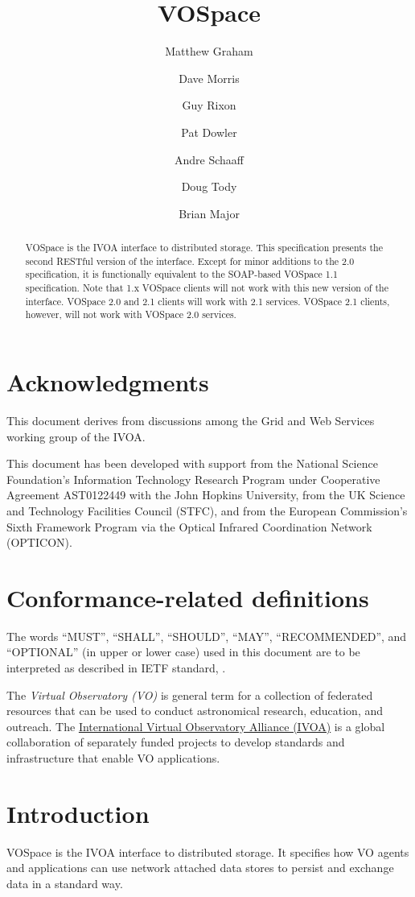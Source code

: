 \documentclass[11pt,a4paper]{ivoa}
\title{VOSpace}
\author{Matthew Graham}
\author{Dave Morris}
\author{Guy Rixon}
\author{Pat Dowler}
\author{Andre Schaaff}
\author{Doug Tody}
\author{Brian Major}
\begin{document}
\begin{abstract}
VOSpace is the IVOA interface to distributed storage. This specification presents the second RESTful version of the interface.  Except for minor additions to the 2.0 specification, it is functionally equivalent to the SOAP-based VOSpace 1.1 specification. Note that 1.x VOSpace clients will not work with this new version of the interface.  VOSpace 2.0 and 2.1 clients will work with 2.1 services.  VOSpace 2.1 clients, however, will not work with VOSpace 2.0 services.
\end{abstract}

\section*{Acknowledgments}
\label{sec:acknowledgments}
This document derives from discussions among the Grid and Web Services working group of the IVOA.

This document has been developed with support from the National Science Foundation's Information Technology Research Program under Cooperative Agreement AST0122449 with the John Hopkins University, from the UK Science and Technology Facilities Council (STFC), and from the European Commission's Sixth Framework Program via the Optical Infrared Coordination Network (OPTICON).

\section*{Conformance-related definitions}
\label{sec:conformance-related definitions}
The words ``MUST'', ``SHALL'', ``SHOULD'', ``MAY'', ``RECOMMENDED'', and
``OPTIONAL'' (in upper or lower case) used in this document are to be
interpreted as described in IETF standard, \citep{std:RFC2119}.

The \emph{Virtual Observatory (VO)} is
general term for a collection of federated resources that can be used
to conduct astronomical research, education, and outreach.
The \href{http://www.ivoa.net}{International
Virtual Observatory Alliance (IVOA)} is a global
collaboration of separately funded projects to develop standards and
infrastructure that enable VO applications.

\section{Introduction}
\label{sec:introduction}
VOSpace is the IVOA interface to distributed storage. It specifies how VO agents and applications can use network attached data stores to persist and exchange data in a standard way.
\end{document}
